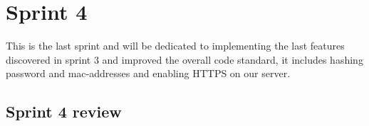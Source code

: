 \chapter{Sprint 4}
This is the last sprint and will be dedicated to implementing the last features discovered in sprint 3 and improved the overall code standard, it includes hashing password and mac-addresses and enabling HTTPS on our server. %






\section{Sprint 4 review}